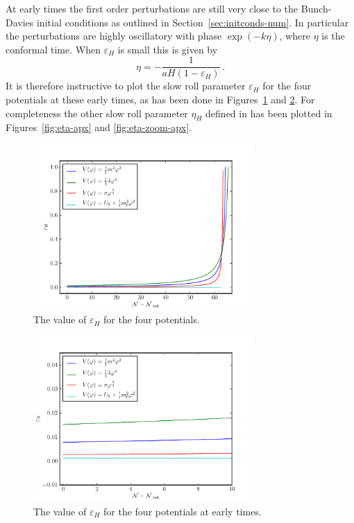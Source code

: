 At early times the first order perturbations are still very close to the Bunch-Davies initial
conditions as outlined in Section~\ref{sec:initconds-num}. In particular the perturbations are
highly oscillatory with phase $\exp(-k\eta)$, where $\eta$ is the conformal time. When
$\varepsilon_H$ is small this is given by 
% 
\begin{equation}
 \eta = -\frac{1}{aH(1-\varepsilon_H)}\,.
\end{equation}
% 
It is therefore instructive to plot the slow roll parameter $\varepsilon_H$ for the four potentials
at these early times, as has been done in Figures~\ref{fig:eps-apx} and \ref{fig:eps-zoom-apx}. For
completeness the other slow roll parameter $\eta_H$ defined in  has been
plotted in Figures~\ref{fig:eta-apx} and \ref{fig:eta-zoom-apx}. 

\begin{figure}
 \centering
 \includegraphics[width=0.75\textwidth]{numerical/graphs/epsilon_slowroll-large.pdf}
 \caption[Value of $\varepsilon_H$ for the Four Potentials]{The value of $\varepsilon_H$ for
the four potentials.}
 \label{fig:eps-apx}
\end{figure}

\begin{figure}
 \centering
 \includegraphics[width=0.75\textwidth]{numerical/graphs/epsilon_slowroll_zoom-large.pdf}
 \caption[Value of $\varepsilon_H$ for the Four Potentials at Early Times]{The value of
$\varepsilon_H$ for the four potentials at early times.}
 \label{fig:eps-zoom-apx}
\end{figure}


